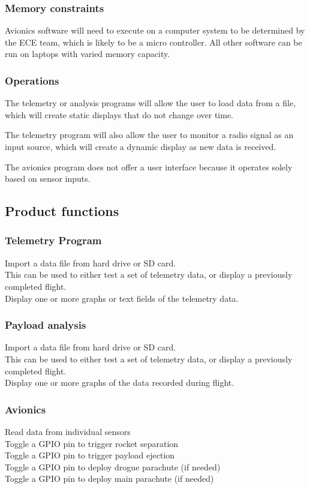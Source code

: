 \documentclass[onecolumn, draftclsnofoot, 10pt, compsoc]{IEEEtran}
\begin{document}
\subsubsection{Memory constraints}
Avionics software will need to execute on a computer system to be determined by the ECE team, which is likely to be a micro controller. All other software can be run on laptops with varied memory capacity.

\subsubsection{Operations}
The telemetry or analysis programs will allow the user to load data from a file, which will create static displays that do not change over time.

The telemetry program will also allow the user to monitor a radio signal as an input source, which will create a dynamic display as new data is received.

The avionics program does not offer a user interface because it operates solely based on sensor inputs.

\subsection{Product functions}
\subsubsection{Telemetry Program}
Import a data file from hard drive or SD card.\\
This can be used to either test a set of telemetry data, or display a previously completed flight.\\
Display one or more graphs or text fields of the telemetry data.

\subsubsection{Payload analysis}
Import a data file from hard drive or SD card.\\
This can be used to either test a set of telemetry data, or display a previously completed flight.\\
Display one or more graphs of the data recorded during flight.

\subsubsection{Avionics}
Read data from individual sensors\\
Toggle a GPIO pin to trigger rocket separation\\
Toggle a GPIO pin to trigger payload ejection\\
Toggle a GPIO pin to deploy drogue parachute (if needed)\\
Toggle a GPIO pin to deploy main parachute (if needed)
\end{document}
